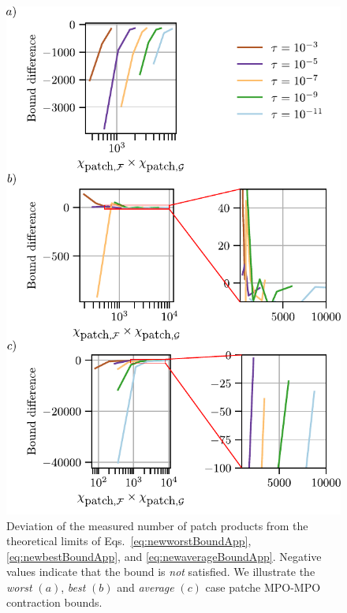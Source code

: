 \begin{figure}[htpb]
    \centering
    \includegraphics{figures/patchedMulBounds.pdf}
    \caption{Deviation of the measured number of patch products from the theoretical limits of Eqs.~\eqref{eq:newworstBoundApp}, \eqref{eq:newbestBoundApp}, and \eqref{eq:newaverageBoundApp}. Negative values indicate that the bound is \emph{not} satisfied. We illustrate the \textit{worst} $(a)$, \textit{best} $(b)$ and \textit{average} $(c)$ case patche MPO-MPO contraction bounds.}
    \label{fig:patchedMulBounds}
\end{figure}



